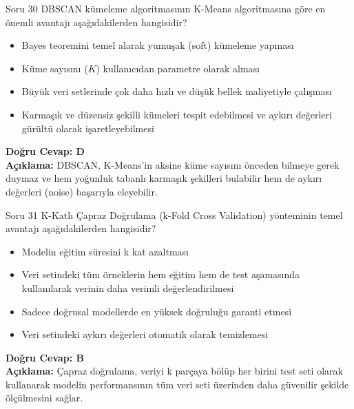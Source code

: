 \documentclass[12pt,a4paper]{article}
\begin{document}
\begin{testcard}{Soru 30}
    DBSCAN kümeleme algoritmasının K-Means algoritmasına göre en önemli avantajı aşağıdakilerden hangisidir?
    \begin{itemize}
        \item[A)] Bayes teoremini temel alarak yumuşak (soft) kümeleme yapması
        \item[B)] Küme sayısını ($K$) kullanıcıdan parametre olarak alması
        \item[C)] Büyük veri setlerinde çok daha hızlı ve düşük bellek maliyetiyle çalışması
        \item[D)] Karmaşık ve düzensiz şekilli kümeleri tespit edebilmesi ve aykırı değerleri gürültü olarak işaretleyebilmesi
    \end{itemize}
    \tcblower
    \textbf{Doğru Cevap: D} \\
    \textbf{Açıklama:} DBSCAN, K-Means'in aksine küme sayısını önceden bilmeye gerek duymaz ve hem yoğunluk tabanlı karmaşık şekilleri bulabilir hem de aykırı değerleri (noise) başarıyla eleyebilir.
\end{testcard}

\begin{testcard}{Soru 31}
    K-Katlı Çapraz Doğrulama (k-Fold Cross Validation) yönteminin temel avantajı aşağıdakilerden hangisidir?
    \begin{itemize}
        \item[A)] Modelin eğitim süresini k kat azaltması
        \item[B)] Veri setindeki tüm örneklerin hem eğitim hem de test aşamasında kullanılarak verinin daha verimli değerlendirilmesi
        \item[C)] Sadece doğrusal modellerde en yüksek doğruluğu garanti etmesi
        \item[D)] Veri setindeki aykırı değerleri otomatik olarak temizlemesi
    \end{itemize}
    \tcblower
    \textbf{Doğru Cevap: B} \\
    \textbf{Açıklama:} Çapraz doğrulama, veriyi k parçaya bölüp her birini test seti olarak kullanarak modelin performansının tüm veri seti üzerinden daha güvenilir şekilde ölçülmesini sağlar.
\end{testcard}
\end{document}
